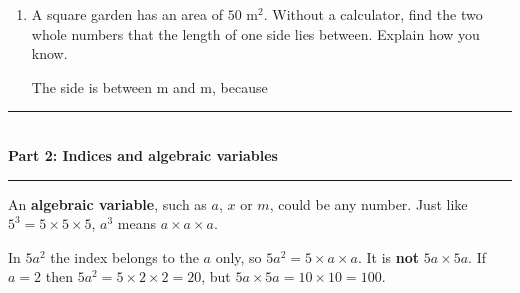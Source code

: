 \documentclass[12pt,a4paper]{article}
\newcommand{\ansline}[1][2.2cm]{\underline{\hspace{#1}}}
\newcommand{\heading}[1]{%
  \vspace{2pt}
  {\color{blue!45!black}\rule{\linewidth}{1pt}}\\[1pt]
  {\large\bfseries #1}\\[-6pt]
  {\color{blue!45!black}\rule{\linewidth}{0.4pt}}
  \vspace{2pt}}
\newcommand{\parttitle}[2]{\heading{Part #1: #2}}
\begin{document}
\begin{enumerate}[resume]
\begin{enumerate}
\vspace{2pt}
\begin{minipage}[t]{0.34\linewidth}
\centering
{}
\end{minipage}%
\begin{minipage}[t]{0.62\linewidth}
\vspace{1.4em}
Side $=\sqrt{0.25}=\ansline[1.8cm]$ m
\end{minipage}

  \item A square garden has an area of $50$ m$^2$. Without a calculator, find
        the two whole numbers that the length of one side lies between. Explain
        how you know.

\vspace{2pt}
\begin{minipage}[t]{0.34\linewidth}
\centering
{}
\end{minipage}%
\begin{minipage}[t]{0.62\linewidth}
\vspace{1.4em}
The side is between \ansline[1.2cm] m and \ansline[1.2cm] m, because

\vspace{14pt}
\ansline[9.5cm]
\end{minipage}
\end{enumerate}

\end{enumerate}

\vspace{6pt}

\newpage{}

\parttitle{2}{Indices and algebraic variables}

An \textbf{algebraic variable}, such as $a$, $x$ or $m$, could be any number. Just like $5^3=5\times5\times5$, $a^3$ means $a\times a\times a$.


\begin{warning}
In $5a^2$ the index belongs to the $a$ only, so $5a^2=5\times a\times a$. It is
\textbf{not} $5a\times5a$. If $a=2$ then $5a^2=5\times2\times2=20$, but
$5a\times5a=10\times10=100$.
\end{warning}
\end{document}
